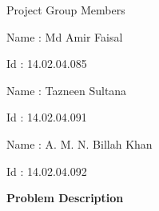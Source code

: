 \documentclass[12pt]{article}
\begin{document}
\vspace{\baselineskip}
\begin{Center}
{\fontsize{16pt}{19.2pt}\selectfont Project Group Members\par}
\end{Center}\par


\vspace{\baselineskip}
\begin{Center}
{\fontsize{16pt}{19.2pt}\selectfont Name : Md Amir Faisal\par}
\end{Center}\par

\begin{Center}
{\fontsize{16pt}{19.2pt}\selectfont Id : 14.02.04.085\par}
\end{Center}\par


\vspace{\baselineskip}
\begin{Center}
{\fontsize{16pt}{19.2pt}\selectfont Name : Tazneen Sultana\par}
\end{Center}\par

\begin{Center}
{\fontsize{16pt}{19.2pt}\selectfont Id : 14.02.04.091\par}
\end{Center}\par


\vspace{\baselineskip}
\begin{Center}
{\fontsize{16pt}{19.2pt}\selectfont Name : A. M. N. Billah Khan\par}
\end{Center}\par

\begin{Center}
{\fontsize{16pt}{19.2pt}\selectfont Id : 14.02.04.092\par}
\end{Center}\par

\begin{justify}
{\fontsize{14pt}{16.8pt}\selectfont \textbf{Problem Description}\par}
\end{justify}\par
\end{document}
